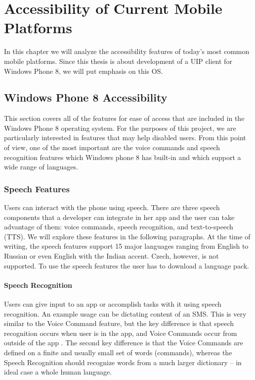 \section{Accessibility of Current Mobile Platforms}
In this chapter we will analyze the accessibility features of today's most common mobile platforms. Since this thesis is about development of a UIP client for Windows Phone 8, we will put emphasis on this OS.

\subsection{Windows Phone 8 Accessibility}
This section covers all of the features for ease of access that are included in the Windows Phone 8 operating system. For the purposes of this project, we are particularly interested in features that may help disabled users. From this point of view, one of the most important are the voice commands and speech recognition features which Windows phone 8 has built-in and which support a wide range of languages.

\subsubsection{Speech Features}
Users can interact with the phone using speech. There are three speech components that a developer can integrate in her app and the user can take advantage of them: voice commands, speech recognition, and text-to-speech (TTS). We will explore these features in the following paragraphs.
At the time of writing, the speech features support 15 major languages ranging from English to Russian or even English with the Indian accent. Czech, however, is not supported. To use the speech features the user has to download a language pack.

\paragraph{Speech Recognition}
Users can give input to an app or accomplish tasks with it using speech recognition. An example usage can be dictating content of an SMS. This is very similar to the Voice Command feature, but the key difference is that speech recognition occurs when user is in the app, and Voice Commands occur from outside of the app \cite{phone8speech}. The second key difference is that the Voice Commands are defined on a finite and usually small set of words (commands), whereas the Speech Recognition should recognize words from a much larger dictionary – in ideal case a whole human language.

